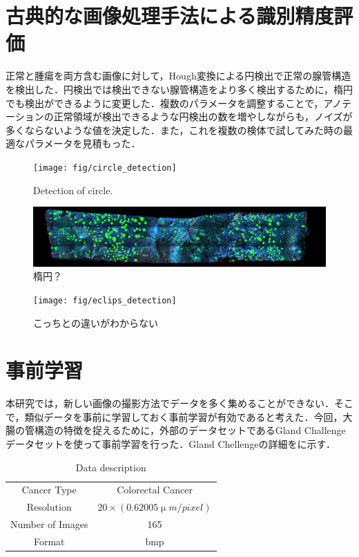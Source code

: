 \section{古典的な画像処理手法による識別精度評価}
正常と腫瘍を両方含む画像に対して，Hough変換による円検出で正常の腺管構造を検出した．円検出では検出できない腺管構造をより多く検出するために，楕円でも検出ができるように変更した．複数のパラメータを調整することで，アノテーションの正常領域が検出できるような円検出の数を増やしながらも，ノイズが多くならないような値を決定した．また，これを複数の検体で試してみた時の最適なパラメータを見積もった．

\begin{figure}[H]
	\centering
	\texttt{[image: fig/circle\_detection]}
	\caption{Detection of circle.}
	\label{fig:circle_detection}
\end{figure}

\begin{figure}[H]
	\centering
	\includegraphics[width=0.7\linewidth]{fig/eclips_low}
	\caption{楕円？}
	\label{fig:eclipslow}
\end{figure}

\begin{figure}[H]
	\centering
	\texttt{[image: fig/eclips\_detection]}
	\caption{こっちとの違いがわからない}
	\label{fig:eclips_detection}
\end{figure}



\section{事前学習}
本研究では，新しい画像の撮影方法でデータを多く集めることができない．そこで，類似データを事前に学習しておく事前学習が有効であると考えた．今回，大腸の管構造の特徴を捉えるために，外部のデータセットであるGland Challengeデータセットを使って事前学習を行った．Gland Chellengeの詳細をに示す．

\begin{table}[H]
	\centering
	\caption{Data description}
	\label{tab:GlandChallenge}
	\begin{tabular}{cc}\toprule
		Cancer Type & Colorectal Cancer \\ 
		Resolution & $20\times (0.62005 \upmu m/pixel)$ \\ 
		Number of Images & 165 \\ 
		Format & bmp \\ \bottomrule
	\end{tabular} 
\end{table}


